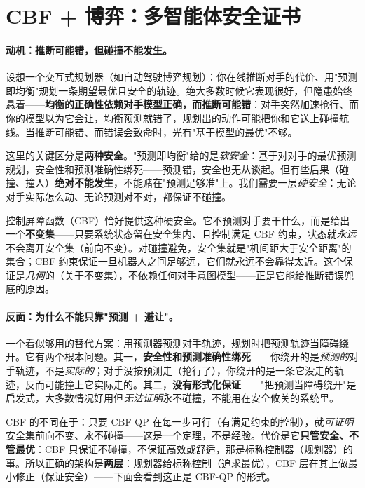 \section{CBF + 博弈：多智能体安全证书}
\label{sec:sm-cbf-game}

\paragraph{动机：推断可能错，但碰撞不能发生。}
设想一个交互式规划器（如自动驾驶博弈规划）：你在线推断对手的代价、用"预测即均衡"规划一条期望最优且安全的轨迹。绝大多数时候它表现很好，但隐患始终悬着——\textbf{均衡的正确性依赖对手模型正确，而推断可能错}：对手突然加速抢行、而你的模型以为它会让，均衡预测就错了，规划出的动作可能把你和它送上碰撞航线。当推断可能错、而错误会致命时，光有"基于模型的最优"不够。

这里的关键区分是\textbf{两种安全}。"预测即均衡"给的是\emph{软安全}：基于对对手的最优预测规划，安全性和预测准确性绑死——预测错，安全也无从谈起。但有些后果（碰撞、撞人）\textbf{绝对不能发生}，不能赌在"预测足够准"上。我们需要一层\emph{硬安全}：无论对手实际怎么动、无论预测对不对，都保证不碰撞。

控制屏障函数（CBF）恰好提供这种硬安全。它不预测对手要干什么，而是给出一个\textbf{不变集}——只要系统状态留在安全集内、且控制满足 CBF 约束，状态就\emph{永远}不会离开安全集（前向不变）。对碰撞避免，安全集就是"机间距大于安全距离"的集合；CBF 约束保证一旦机器人之间足够远，它们就永远不会靠得太近。这个保证是\emph{几何}的（关于不变集），不依赖任何对手意图模型——正是它能给推断错误兜底的原因。

\paragraph{反面：为什么不能只靠"预测 + 避让"。}
一个看似够用的替代方案：用预测器预测对手轨迹，规划时把预测轨迹当障碍绕开。它有两个根本问题。其一，\textbf{安全性和预测准确性绑死}——你绕开的是\emph{预测的}对手轨迹，不是\emph{实际的}；对手没按预测走（抢行了），你绕开的是一条它没走的轨迹，反而可能撞上它实际走的。其二，\textbf{没有形式化保证}——"把预测当障碍绕开"是启发式，大多数情况好用但\emph{无法证明}永不碰撞，不能用在安全攸关的系统里。

CBF 的不同在于：只要 CBF-QP 在每一步可行（有满足约束的控制），就\emph{可证明}安全集前向不变、永不碰撞——这是一个定理，不是经验。代价是它\textbf{只管安全、不管最优}：CBF 只保证不碰撞，不保证高效或舒适，那是标称控制器（规划器）的事。所以正确的架构是\textbf{两层}：规划器给标称控制（追求最优），CBF 层在其上做最小修正（保证安全）——下面会看到这正是 CBF-QP 的形式。


